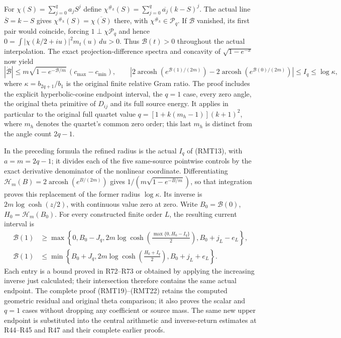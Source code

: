 For $\chi(S)=\sum_{j=0}^qa_jS^j$ define
$\chi^{\#_k}(S)=\sum_{j=0}^q\overline{a_j}(k-S)^j$.
The actual line $\overline S=k-S$ gives
$\chi^{\#_k}(S)=\overline{\chi(S)}$ there, with
$\chi^{\#_k}\in\mathcal P_q$. If $\mathcal B$ vanished,
its first pair would coincide, forcing
$1\perp\chi\mathcal P_q$ and hence
$0=\int|\chi(k/2+iu)|^2m_t(u)\,du>0$.
Thus $\mathcal B(t)>0$ throughout the actual interpolation.
The exact projection-difference spectra and concavity of
$\sqrt{1-e^{-x}}$ now yield
\[
|\dot{\mathcal B}|
\le m\sqrt{1-e^{-\mathcal B/m}}\,(c_{\max}-c_{\min}),\qquad
\left|2\operatorname{arcosh}(e^{\mathcal B(1)/(2m)})
-2\operatorname{arcosh}(e^{\mathcal B(0)/(2m)})\right|
\le I_q\le\log\kappa,
\]
where $\kappa=b_{2q+1}/b_1$ is the original finite relative
Gram ratio. The proof includes the explicit hyperbolic-cosine
endpoint interval, the $q=1$ case, every zero angle, the
original theta primitive of $D_{ij}$ and its full source
energy. It applies in particular to the original full
quartet value $q=[1+k(m_h-1)](k+1)^2$, where $m_h$ denotes
the quartet's common zero order; this last $m_h$ is distinct
from the angle count $2q-1$.


In the preceding formula the refined radius is the actual
\(I_q\) of (RMT13), with \(a=m=2q-1\); it divides each
of the five same-source pointwise controls by the exact
derivative denominator of the nonlinear coordinate.
Differentiating
\(\mathscr H_m(B)=2\operatorname{arcosh}(e^{B/(2m)})\)
gives \(1/(m\sqrt{1-e^{-B/m}})\), so that integration
proves this replacement of the former radius
\(\log\kappa\).  Its inverse is
\(2m\log\cosh(z/2)\), with continuous value zero at zero.
Write \(B_0=\mathcal B(0)\), \(H_0=\mathscr H_m(B_0)\).
For every constructed finite order \(L\), the resulting
current interval is
\[
 \begin{split}
 \mathcal B(1)&\geq
 \max\left\{0,B_0-J_q,
   2m\log\cosh\left(\frac{\max\{0,H_0-I_q\}}2\right),
   B_0+j_L-e_L\right\},\\
 \mathcal B(1)&\leq
 \min\left\{B_0+J_q,
   2m\log\cosh\left(\frac{H_0+I_q}2\right),
   B_0+j_L+e_L\right\}.
 \end{split}
\]
Each entry is a bound proved in R72--R73 or obtained
by applying the increasing inverse just calculated;
their intersection therefore contains the same actual
endpoint.  The complete proof (RMT19)--(RMT22) retains
the computed geometric residual and original theta
comparison; it also proves the scalar and \(q=1\)
cases without dropping any coefficient or source mass.
The same new upper endpoint is substituted into the
central arithmetic and inverse-return estimates at
R44--R45 and R47 and their complete earlier proofs.

